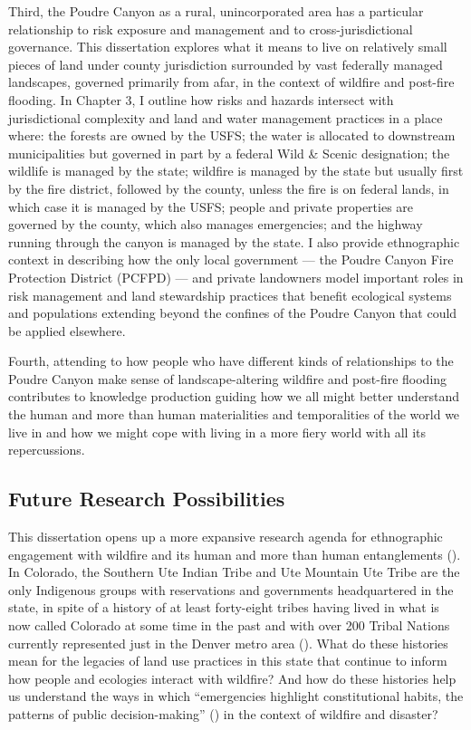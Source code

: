 \documentclass[
]{article}
\begin{document}
Third, the Poudre Canyon as a rural, unincorporated area has a particular relationship to risk exposure and management and to cross-jurisdictional governance. This dissertation explores what it means to live on relatively small pieces of land under county jurisdiction surrounded by vast federally managed landscapes, governed primarily from afar, in the context of wildfire and post-fire flooding. In Chapter 3, I outline how risks and hazards intersect with jurisdictional complexity and land and water management practices in a place where: the forests are owned by the USFS; the water is allocated to downstream municipalities but governed in part by a federal Wild \& Scenic designation; the wildlife is managed by the state; wildfire is managed by the state but usually first by the fire district, followed by the county, unless the fire is on federal lands, in which case it is managed by the USFS; people and private properties are governed by the county, which also manages emergencies; and the highway running through the canyon is managed by the state. I also provide ethnographic context in describing how the only local government --- the Poudre Canyon Fire Protection District (PCFPD) --- and private landowners model important roles in risk management and land stewardship practices that benefit ecological systems and populations extending beyond the confines of the Poudre Canyon that could be applied elsewhere.

Fourth, attending to how people who have different kinds of relationships to the Poudre Canyon make sense of landscape-altering wildfire and post-fire flooding contributes to knowledge production guiding how we all might better understand the human and more than human materialities and temporalities of the world we live in and how we might cope with living in a more fiery world with all its repercussions.

\subsection{Future Research Possibilities}\label{future-research-possibilities}

This dissertation opens up a more expansive research agenda for ethnographic engagement with wildfire and its human and more than human entanglements (). In Colorado, the Southern Ute Indian Tribe and Ute Mountain Ute Tribe are the only Indigenous groups with reservations and governments headquartered in the state, in spite of a history of at least forty-eight tribes having lived in what is now called Colorado at some time in the past and with over 200 Tribal Nations currently represented just in the Denver metro area (). What do these histories mean for the legacies of land use practices in this state that continue to inform how people and ecologies interact with wildfire? And how do these histories help us understand the ways in which ``emergencies highlight constitutional habits, the patterns of public decision-making'' () in the context of wildfire and disaster?
\end{document}
